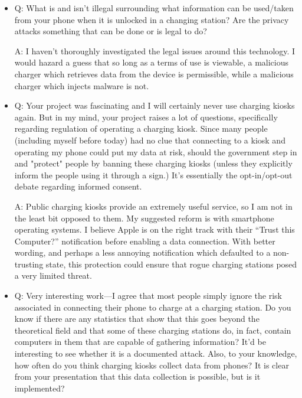 \documentclass[11pt]{article} %
\begin{document}
\begin{itemize}
A: The threat is significant. If you're able to gain access to the phone in this capacity, the phone's data is presented to you in an unencrypted form. You can immediately take any information from the phone which is designed to by synced between phones and computers -- all media and contacts. Moreover, this attack enables the injection of malware onto the phone, as the data communication is two-way. Such an attack was demonstrated by Geogia Tech in 2013\footnote{Ibid.}. 

\item Q: What is and isn't illegal surrounding what information can be used/taken from your phone when it is unlocked in a changing station? Are the privacy attacks something that can be done or is legal to do?

A: I haven't thoroughly investigated the legal issues around this technology. I would hazard a guess that so long as a terms of use is viewable, a malicious charger which retrieves data from the device is permissible, while a malicious charger which injects malware is not. 

\item Q: Your project was fascinating and I will certainly never use charging kiosks again. But in my mind, your project raises a lot of questions, specifically regarding regulation of operating a charging kiosk. Since many people (including myself before today) had no clue that connecting to a kiosk and operating my phone could put my data at risk, should the government step in and "protect" people by banning these charging kiosks (unless they explicitly inform the people using it through a sign.) It's essentially the opt-in/opt-out debate regarding informed consent.

A: Public charging kiosks provide an extremely useful service, so I am not in the least bit opposed to them. My suggested reform is with smartphone operating systems. I believe Apple is on the right track with their ``Trust this Computer?'' notification before enabling a data connection. With better wording, and perhaps a less annoying notification which defaulted to a non-trusting state, this protection could ensure that rogue charging stations posed a very limited threat. 

\item Q: Very interesting work—I agree that most people simply ignore the risk associated in connecting their phone to charge at a charging station. Do you know if there are any statistics that show that this goes beyond the theoretical field and that some of these charging stations do, in fact, contain computers in them that are capable of gathering information? It'd be interesting to see whether it is a documented attack. Also, to your knowledge, how often do you think charging kiosks collect data from phones? It is clear from your presentation that this data collection is possible, but is it implemented?


\end{itemize}
\end{document}
